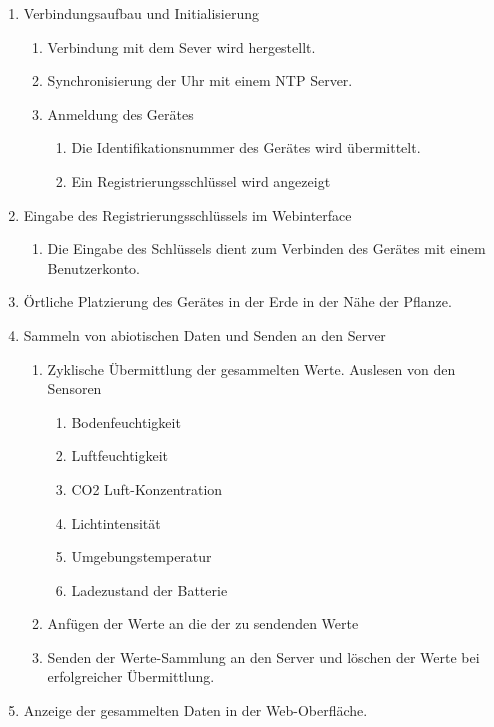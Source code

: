 \documentclass[pointlessnumbers]{scrartcl}
\begin{document}
\begin{enumerate}
    \item Verbindungsaufbau und Initialisierung
    \begin{enumerate}
        \item Verbindung mit dem Sever wird hergestellt. 
        \item Synchronisierung der Uhr mit einem NTP Server. 
        \item Anmeldung des Gerätes 
            \begin{enumerate}
                \item Die Identifikationsnummer des Gerätes wird übermittelt. 
                \item Ein Registrierungsschlüssel wird angezeigt             
            \end{enumerate}
    \end{enumerate}      
        
    \item Eingabe des Registrierungsschlüssels im Webinterface    
    \begin{enumerate}
        \item Die Eingabe des Schlüssels dient zum Verbinden des Gerätes mit einem Benutzerkonto.  
    \end{enumerate}
    
    \item Örtliche Platzierung des Gerätes in der Erde in der Nähe der Pflanze.  
    
    \item Sammeln von abiotischen Daten und Senden an den Server
    \begin{enumerate}
    \item Zyklische Übermittlung der gesammelten Werte. Auslesen von den Sensoren 
        \begin{enumerate}
        \item Bodenfeuchtigkeit 
        \item Luftfeuchtigkeit 
        \item CO2 Luft-Konzentration 
        \item Lichtintensität 
        \item Umgebungstemperatur 
        \item Ladezustand der Batterie 
        \end{enumerate}
    \item Anfügen der Werte an die der zu sendenden Werte 
    \item Senden der Werte-Sammlung an den Server und löschen der Werte bei erfolgreicher Übermittlung.
    \end{enumerate}
    
    \item Anzeige der gesammelten Daten in der Web-Oberfläche.
  
\end{enumerate}
\end{document}

